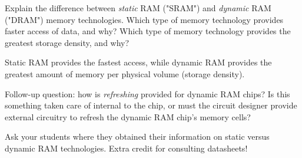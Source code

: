 

Explain the difference between {\it static} RAM ("SRAM") and {\it dynamic} RAM ("DRAM") memory technologies.  Which type of memory technology provides faster access of data, and why?  Which type of memory technology provides the greatest storage density, and why?







Static RAM provides the fastest access, while dynamic RAM provides the greatest amount of memory per physical volume (storage density).

\vskip 10pt

Follow-up question: how is {\it refreshing} provided for dynamic RAM chips?  Is this something taken care of internal to the chip, or must the circuit designer provide external circuitry to refresh the dynamic RAM chip's memory cells?







Ask your students where they obtained their information on static versus dynamic RAM technologies.  Extra credit for consulting datasheets!




